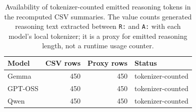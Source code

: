 \begin{table}[t]
    \centering
    \caption{Availability of tokenizer-counted emitted reasoning tokens in the recomputed CSV summaries. The value counts generated reasoning text extracted between \texttt{R:} and \texttt{A:} with each model's local tokenizer; it is a proxy for emitted reasoning length, not a runtime usage counter.}
    \label{tab:budget-observability}
    \small
    \begin{tabular}{lrrl}
        \toprule
        Model & CSV rows & Proxy rows & Status \\
        \midrule
        Gemma & 450 & 450 & tokenizer-counted \\
        GPT-OSS & 450 & 450 & tokenizer-counted \\
        Qwen & 450 & 450 & tokenizer-counted \\
        \bottomrule
    \end{tabular}
\end{table}
